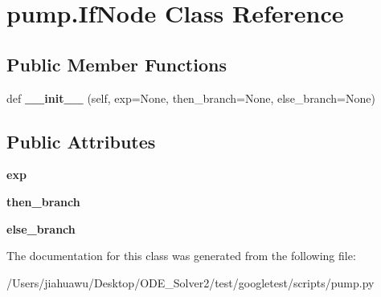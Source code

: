 \hypertarget{classpump_1_1_if_node}{}\section{pump.\+If\+Node Class Reference}
\label{classpump_1_1_if_node}
\subsection*{Public Member Functions}
\begin{DoxyCompactItemize}
\item 
\mbox{\label{classpump_1_1_if_node_ab8bff21c18d60b461f7b6fa9dfa59f7c}} 
def {\bfseries \+\_\+\+\_\+init\+\_\+\+\_\+} (self, exp=None, then\+\_\+branch=None, else\+\_\+branch=None)
\end{DoxyCompactItemize}
\subsection*{Public Attributes}
\begin{DoxyCompactItemize}
\item 
\mbox{\label{classpump_1_1_if_node_a92042e4262196ffd7366350539f512d8}} 
{\bfseries exp}
\item 
\mbox{\label{classpump_1_1_if_node_aa9e2e488564629f8dc0d64d165a19ffa}} 
{\bfseries then\+\_\+branch}
\item 
\mbox{\label{classpump_1_1_if_node_a12e422b16ed4291f15cd95cd6e7f81eb}} 
{\bfseries else\+\_\+branch}
\end{DoxyCompactItemize}


The documentation for this class was generated from the following file\+:\begin{DoxyCompactItemize}
\item 
/\+Users/jiahuawu/\+Desktop/\+O\+D\+E\+\_\+\+Solver2/test/googletest/scripts/pump.\+py\end{DoxyCompactItemize}
